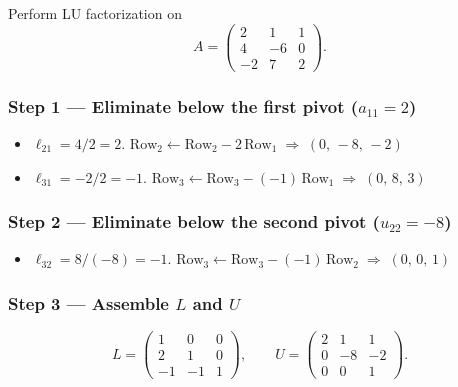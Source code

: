 \documentclass[11pt, a4paper]{article}
\begin{document}
\begin{example}\label{example:1.1}
Perform LU factorization on
\[
A = \begin{pmatrix} 2 & 1 & 1 \\ 4 & -6 & 0 \\ -2 & 7 & 2 \end{pmatrix}.
\]

\subsubsection*{Step 1 — Eliminate below the first pivot ($a_{11} = 2$)}
\begin{itemize}[itemsep=2pt]
    \item $\ell_{21} = 4/2 = 2$. \quad
          $\text{Row}_2 \leftarrow \text{Row}_2 - 2\,\text{Row}_1
           \;\Rightarrow\; (0,\,-8,\,-2)$
    \item $\ell_{31} = -2/2 = -1$. \quad
          $\text{Row}_3 \leftarrow \text{Row}_3 - (-1)\,\text{Row}_1
           \;\Rightarrow\; (0,\,8,\,3)$
\end{itemize}

\subsubsection*{Step 2 — Eliminate below the second pivot ($u_{22} = -8$)}
\begin{itemize}[itemsep=2pt]
    \item $\ell_{32} = 8/(-8) = -1$. \quad
          $\text{Row}_3 \leftarrow \text{Row}_3 - (-1)\,\text{Row}_2
           \;\Rightarrow\; (0,\,0,\,1)$
\end{itemize}

\subsubsection*{Step 3 — Assemble $L$ and $U$}
\[
L = \begin{pmatrix} 1 & 0 & 0 \\ 2 & 1 & 0 \\ -1 & -1 & 1 \end{pmatrix},
\qquad
U = \begin{pmatrix} 2 & 1 & 1 \\ 0 & -8 & -2 \\ 0 & 0 & 1 \end{pmatrix}.
\]
\end{example}

\end{document}
